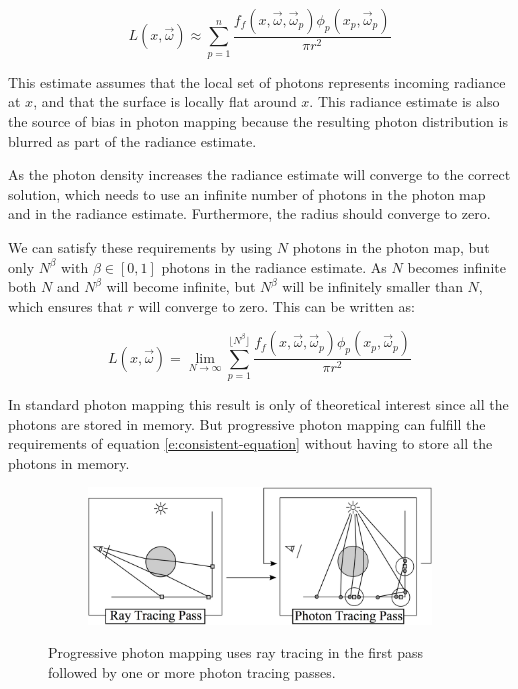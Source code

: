\begin{equation*}
	L(x,\vec{\omega})\approx \sum^{n}_{p=1}\frac{f_f(x,\vec{\omega},\vec{\omega}_p)\phi_p(x_p,\vec{\omega}_p)}{\pi r^{2}}
\end{equation*}

This estimate assumes that the local set of photons represents incoming radiance at $x$, and that the surface is locally flat around $x$. This radiance estimate is also the source of bias in photon mapping because the resulting photon distribution is blurred as part of the radiance estimate.

As the photon density increases the radiance estimate will converge to the correct solution, which needs to use an infinite number of photons in the photon map and in the radiance estimate. Furthermore, the radius should converge to zero.

We can satisfy these requirements by using $N$ photons in the photon map, but only $N^{\beta}$ with $\beta\in[0,1]$ photons in the radiance estimate. As $N$ becomes infinite both $N$ and $N^{\beta}$ will become infinite, but $N^{\beta}$ will be infinitely smaller than $N$, which ensures that $r$ will converge to zero. This can be written as\cite{b:RealisticImageSynthesisUsingPhotonMapping}:

\begin{equation}\label{e:consistent-equation}
	L(x,\vec{\omega})=\lim_{N\to\infty} \sum^{\lfloor N^{\beta} \rfloor}_{p=1}\frac{f_f(x,\vec{\omega},\vec{\omega}_p)\phi_p(x_p,\vec{\omega}_p)}{\pi r^{2}}
\end{equation}

In standard photon mapping this result is only of theoretical interest since all the photons are stored in memory. But progressive photon mapping can fulfill the requirements of equation \ref{e:consistent-equation} without having to store all the photons in memory.

\begin{figure}\label{f:progressive-photon-mapping}
\begin{center}
	\begin{subfigure}[b]{0.75\textwidth}
		\includegraphics[width=1.0\textwidth]{graphics/pm/pm-18}
	\end{subfigure}
\end{center}
\caption{Progressive photon mapping uses ray tracing in the first pass followed by one or more photon tracing passes.}
\end{figure}


